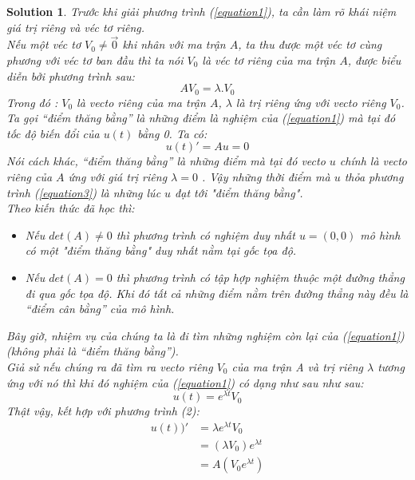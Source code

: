 \documentclass[a4paper]{article}
\newtheorem*{sol}{Solution}
\begin{document}
\begin{sol}
Trước khi giải phương trình (\ref{equation1}), ta cần làm rõ khái niệm giá trị riêng và véc tơ riêng. \\
Nếu một véc tơ $V_{0} \neq \vec{0} $  khi nhân với ma trận $A$, ta thu được một véc tơ cùng phương với véc tơ ban đầu thì ta nói  $V_{0}$ là véc tơ riêng của ma trận $A$, được biểu diễn bởi phương trình sau: 
\begin{equation}
    AV_0=\lambda.V_0 \label{equation2}
\end{equation}
Trong đó : $V_0$ là vecto riêng của ma trận $A$, $\lambda$ là trị riêng ứng với vecto riêng $V_0$.\\
Ta gọi “điểm thăng bằng” là những điểm là nghiệm của (\ref{equation1}) mà tại đó tốc độ biến đổi của $u(t)$   bằng 0. Ta có: \\
\begin{equation}  \label {equation3}
    {u(t)}'=Au=0
\end{equation}
Nói cách khác, “điểm thăng bằng” là những điểm mà tại đó vecto $u$ chính là vecto riêng của $A$ ứng với giá trị riêng $\lambda=0$ .
Vậy những thời điểm mà $u$ thỏa phương trình (\ref{equation3}) là những lúc $u$ đạt tới "điểm thăng bằng".\\
Theo kiến thức đã học thì:
\begin{itemize}
    \item Nếu $det(A)\neq 0$ thì phương trình có nghiệm duy nhất $u=(0,0)$ mô hình có một "điểm thăng bằng" duy nhất nằm tại gốc tọa độ.
    \item Nếu $det(A) = 0$ thì phương trình có tập hợp nghiệm thuộc một đường thẳng đi qua gốc tọa độ. Khi đó tất cả những điểm nằm trên đường thẳng này đều là “điểm cân bằng” của mô hình.
\end{itemize}
Bây giờ, nhiệm vụ của chúng ta là đi tìm những nghiệm còn lại của (\ref{equation1}) (không phải là “điểm thăng bằng”).\\
Giả sử nếu chúng ra đã tìm ra vecto riêng $V_0$ của ma trận A và trị riêng $\lambda$ tương ứng với nó thì khi đó nghiệm của (\ref{equation1}) có dạng như sau như sau:
\begin{equation} \label{equation4}
    u(t)=e^{\lambda t} V_{0} 
\end{equation}
Thật vậy, kết hợp với phương trình (2): 
\begin{align*}
    {u(t))}' &=\lambda e^{\lambda t}V_{0}\\
    &=(\lambda V_{0}) e^{\lambda t}\\
    &=A (V_{0} e^{\lambda t}) \\

\end{align*}
\end{sol}
\end{document}
